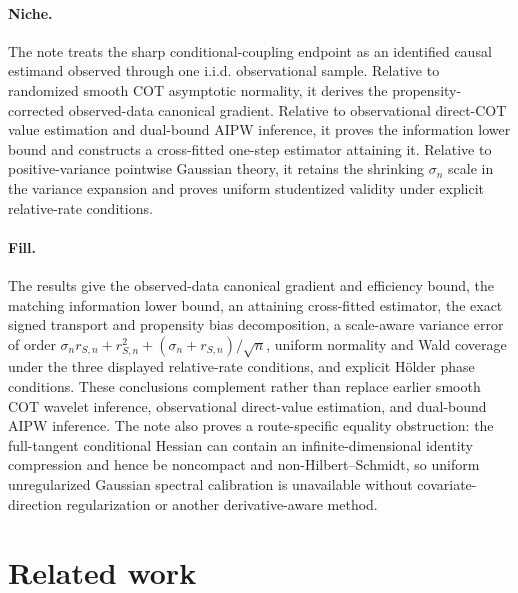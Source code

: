 \documentclass{article}
\begin{document}
\paragraph{Niche.} The note treats the sharp conditional-coupling endpoint as an identified causal estimand observed through one i.i.d. observational sample. Relative to randomized smooth COT asymptotic normality, it derives the propensity-corrected observed-data canonical gradient. Relative to observational direct-COT value estimation and dual-bound AIPW inference, it proves the information lower bound and constructs a cross-fitted one-step estimator attaining it. Relative to positive-variance pointwise Gaussian theory, it retains the shrinking \(\sigma_n\) scale in the variance expansion and proves uniform studentized validity under explicit relative-rate conditions.

\paragraph{Fill.} The results give the observed-data canonical gradient and efficiency bound, the matching information lower bound, an attaining cross-fitted estimator, the exact signed transport and propensity bias decomposition, a scale-aware variance error of order \(\sigma_n r_{S,n}+r_{S,n}^2+(\sigma_n+r_{S,n})/\sqrt n\), uniform normality and Wald coverage under the three displayed relative-rate conditions, and explicit H\"older phase conditions. These conclusions complement rather than replace earlier smooth COT wavelet inference, observational direct-value estimation, and dual-bound AIPW inference. The note also proves a route-specific equality obstruction: the full-tangent conditional Hessian can contain an infinite-dimensional identity compression and hence be noncompact and non-Hilbert--Schmidt, so uniform unregularized Gaussian spectral calibration is unavailable without covariate-direction regularization or another derivative-aware method.

\section{Related work}
\end{document}
